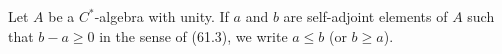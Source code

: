 Let $A$ be a $C^*$-algebra with unity. If $a$ and $b$ are self-adjoint elements of $A$ such that $b - a \geq 0$ in the sense of (61.3), we write $a \leq b$ (or $b \geq a$).
